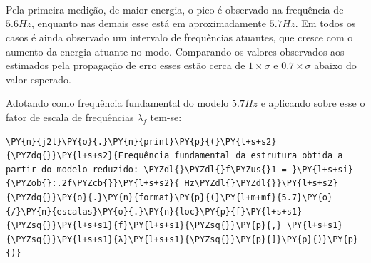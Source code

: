     \begin{center}
    \end{center}
    { \hspace*{\fill} \\}
    
    \begin{center}
    \end{center}
    { \hspace*{\fill} \\}
    
    \begin{center}
    \end{center}
    { \hspace*{\fill} \\}
    
    Pela primeira medição, de maior energia, o pico é observado na
frequência de \(5.6 Hz\), enquanto nas demais esse está em
aproximadamente \(5.7 Hz\). Em todos os casos é ainda observado um
intervalo de frequências atuantes, que cresce com o aumento da energia
atuante no modo. Comparando os valores observados aos estimados pela
propagação de erro esses estão cerca de \(1\times\sigma\) e
\(0.7\times\sigma\) abaixo do valor esperado.

Adotando como frequência fundamental do modelo \(5.7 Hz\) e aplicando
sobre esse o fator de escala de frequências \(\lambda_f\) tem-se:

    \begin{tcolorbox}[breakable, size=fbox, boxrule=1pt, pad at break*=1mm,colback=cellbackground, colframe=cellborder]
\begin{Verbatim}[commandchars=\\\{\}]
\PY{n}{j2l}\PY{o}{.}\PY{n}{print}\PY{p}{(}\PY{l+s+s2}{\PYZdq{}}\PY{l+s+s2}{Frequência fundamental da estrutura obtida a partir do modelo reduzido: \PYZdl{}\PYZdl{}f\PYZus{}1 = }\PY{l+s+si}{\PYZob{}:.2f\PYZcb{}}\PY{l+s+s2}{ Hz\PYZdl{}\PYZdl{}}\PY{l+s+s2}{\PYZdq{}}\PY{o}{.}\PY{n}{format}\PY{p}{(}\PY{l+m+mf}{5.7}\PY{o}{/}\PY{n}{escalas}\PY{o}{.}\PY{n}{loc}\PY{p}{[}\PY{l+s+s1}{\PYZsq{}}\PY{l+s+s1}{f}\PY{l+s+s1}{\PYZsq{}}\PY{p}{,} \PY{l+s+s1}{\PYZsq{}}\PY{l+s+s1}{λ}\PY{l+s+s1}{\PYZsq{}}\PY{p}{]}\PY{p}{)}\PY{p}{)}
\end{Verbatim}
\end{tcolorbox}

